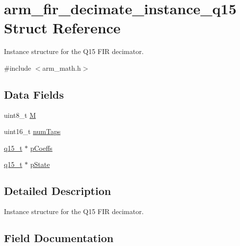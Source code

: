 \hypertarget{structarm__fir__decimate__instance__q15}{}\section{arm\+\_\+fir\+\_\+decimate\+\_\+instance\+\_\+q15 Struct Reference}
\label{structarm__fir__decimate__instance__q15}


Instance structure for the Q15 F\+IR decimator.  




{\ttfamily \#include $<$arm\+\_\+math.\+h$>$}

\subsection*{Data Fields}
\begin{DoxyCompactItemize}
\item 
uint8\+\_\+t \mbox{\hyperlink{structarm__fir__decimate__instance__q15_ae2c8107d00d3c9942e7a20fc598edecf}{M}}
\item 
uint16\+\_\+t \mbox{\hyperlink{structarm__fir__decimate__instance__q15_a751941891e47f522a7f5375fe8990aac}{num\+Taps}}
\item 
\mbox{\hyperlink{arm__math_8h_ab5a8fb21a5b3b983d5f54f31614052ea}{q15\+\_\+t}} $\ast$ \mbox{\hyperlink{structarm__fir__decimate__instance__q15_a7ca181a37f714d174445f486bebce26f}{p\+Coeffs}}
\item 
\mbox{\hyperlink{arm__math_8h_ab5a8fb21a5b3b983d5f54f31614052ea}{q15\+\_\+t}} $\ast$ \mbox{\hyperlink{structarm__fir__decimate__instance__q15_ae29dfdb736374fcddaeaec4b7770170c}{p\+State}}
\end{DoxyCompactItemize}


\subsection{Detailed Description}
Instance structure for the Q15 F\+IR decimator. 

\subsection{Field Documentation}
\mbox{\label{structarm__fir__decimate__instance__q15_ae2c8107d00d3c9942e7a20fc598edecf}} 
